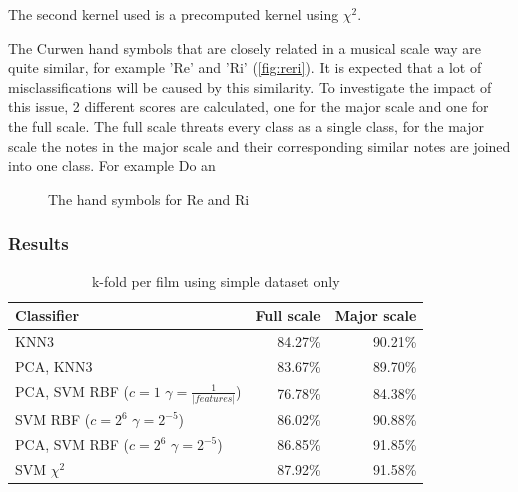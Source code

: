 The second kernel used is a precomputed kernel using $\chi^2$.

The Curwen hand symbols that are closely related in a musical scale way are quite similar, for example 'Re' and 'Ri' (\autoref{fig:reri}). It is expected that a lot of misclassifications will be caused by this similarity. To investigate the impact of this issue, 2 different scores are calculated, one for the major scale and one for the full scale. The full scale threats every class as a single class, for the major scale the notes in the major scale and their corresponding similar notes are joined into one class. For example Do an

\begin{figure}[htbp]
  \centering
{}
\hspace{0.03\linewidth}
  \caption{The hand symbols for Re and Ri}
  \label{fig:reri}
\end{figure}




\subsubsection{Results}

\begin{table}
\centering
\begin{tabular}{lrr}
\hline\hline
Classifier 				&  	Full scale	& Major scale	\\
\hline
KNN3 		&  	84.27\%		& 90.21\%		\\
PCA, KNN3 	& 	83.67\%		& 89.70\%		\\
PCA, SVM RBF ($c=1$ $\gamma=\frac{1}{|features|}$)	& 	76.78\%		& 84.38\%		\\
SVM RBF ($c=2^6$ $\gamma=2^{-5}$) & 86.02\% & 90.88\% \\
PCA, SVM RBF ($c=2^6$ $\gamma=2^{-5}$) &  86.85\% & 91.85\% \\
SVM $\chi^2$ & 87.92\% 		& 91.58\% \\
\hline
\end{tabular}
\caption{k-fold per film using simple dataset only}
\end{table}


